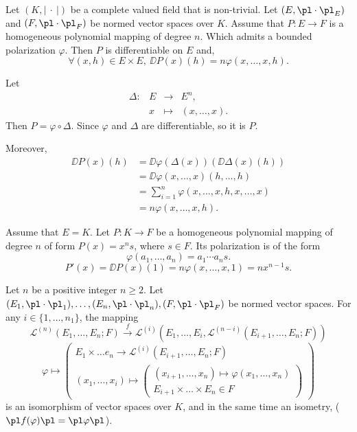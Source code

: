 \begin{propositionenv}
    Let $(K,\left|\ \cdot\ \right|)$ be a complete valued field that is non-trivial. Let $(E,\pl\cdot\pl_E)$ and $(F,\pl\cdot\pl_F)$ be normed vector spaces over $K$. Assume that $P:E\longrightarrow F$ is a homogeneous polynomial mapping of degree $n$. Which admits a bounded polarization $\varphi$. Then $P$ is differentiable on $E$ and,
    $$\forall (x,h)\in E\times E,\ \DD P(x)(h)=n\varphi(x,\ldots,x,h).$$
\end{propositionenv}
\begin{proofenv}
    Let $$ \begin{array}{rrcl}
            \Delta:&E&\longrightarrow& E^n,\\
             &x&\longmapsto& (x,\ldots,x).
        \end{array}$$
        Then $P=\varphi\circ \Delta$. Since $\varphi$ and $\Delta$ are differentiable, so it is $P$. 

    Moreover,
    \begin{align*}
        \DD P(x)(h)&=\DD \varphi(\Delta(x))\left(\DD \Delta(x)(h)\right)\\
        &=\DD \varphi(x ,\ldots,x)(h,\ldots,h)\\
        &=\sum_{i=1}^n \varphi(x,\ldots,x,h,x,\ldots,x)\\
        &=n\varphi(x,\ldots,x,h).
    \end{align*}
\end{proofenv}
\begin{remark}
    Assume that $E=K$. Let $P:K\longrightarrow F$ be a homogeneous polynomial mapping of degree $n$ of form $P(x)=x^n s$, where $s\in F$. Its polarization is of the form 
    $$\varphi(a_1,\ldots,a_n)=a_1\cdots a_n s.$$
    $$P'(x)=\DD P(x)(1)=n\varphi(x,\ldots,x,1)=n x^{n-1} s.$$
\end{remark}
\begin{propositionenv}
    Let $n$ be a positive integer $n\ge 2$. Let $(E_1,\pl\cdot\pl_1),\ldots,(E_n,\pl\cdot\pl_n), (F,\pl\cdot\pl_F)$ be normed vector spaces. For any $i\in\{1,\ldots,n_1\}$, the mapping
    $$\mathscr{L}^{(n)}(E_1,\ldots,E_n;F)\overset{f}{\longrightarrow}\mathscr{L}^{(i)}(E_1,\ldots,E_i,\mathscr{L}^{(n-i)}(E_{i+1},\ldots,E_n;F))$$
    $$\varphi\longmapsto \left(\substack{E_1\times \ldots e_n\longrightarrow\mathscr{L}^{(i)}(E_{i+1},\ldots,E_n;F)\\ (x_1,\ldots,x_i)\longmapsto\left(\substack{(x_{i+1},\ldots,x_n)\longmapsto \varphi(x_1,\ldots,x_n)\\E_{i+1}\times\ldots\times E_n\in F}\right)}\right)$$
    is an isomorphism of vector spaces over $K$, and in the same time an isometry, ($\pl f(\varphi)\pl=\pl\varphi\pl$).
\end{propositionenv}
